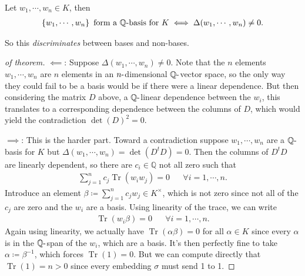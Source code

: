 \begin{theorem}

Let \(w_1, \cdots, w_n\in K\), then
\begin{align*}
\left\{{ w_1, \cdots, w_n }\right\} \text{ form a ${\mathbb{Q}}{\hbox{-}}$basis for $K$}
\iff
\Delta(w_1, \cdots, w_n) \neq 0
.\end{align*}

\end{theorem}

\begin{remark}

So this \emph{discriminates} between bases and non-bases.

\end{remark}

\begin{proof}[of theorem]

\(\impliedby\): Suppose \(\Delta(w_1, \cdots, w_n) \neq 0\). Note that
the \(n\) elements \(w_1, \cdots, w_n\) are \(n\) elements in an
\(n{\hbox{-}}\)dimensional \({\mathbb{Q}}{\hbox{-}}\)vector space, so
the only way they could fail to be a basis would be if there were a
linear dependence. But then considering the matrix \(D\) above, a
\({\mathbb{Q}}{\hbox{-}}\)linear dependence between the \(w_i\), this
translates to a corresponding dependence between the columns of \(D\),
which would yield the contradiction \(\det(D)^2 = 0\).

\hfill\break

\(\implies\): This is the harder part. Toward a contradiction suppose
\(w_1, \cdots, w_n\) are a \({\mathbb{Q}}{\hbox{-}}\)basis for \(K\) but
\(\Delta(w_1, \cdots, w_n) = \det(D^t D) = 0\). Then the columns of
\(D^t D\) are linearly dependent, so there are \(c_i \in {\mathbb{Q}}\)
not all zero such that
\begin{align*}
\sum_{j=1}^n c_j \operatorname{Tr}( w_i w_j) = 0 && \forall i=1, \cdots, n
.\end{align*}
Introduce an element
\(\beta \coloneqq\sum_{j=1}^n c_j w_j \in K^{\times}\), which is not
zero since not all of the \(c_j\) are zero and the \(w_i\) are a basis.
Using linearity of the trace, we can write
\begin{align*}
\operatorname{Tr}(w_i \beta) = 0 && \forall i=1, \cdots, n
.\end{align*}
Again using linearity, we actually have
\(\operatorname{Tr}( \alpha \beta) = 0\) for all \(\alpha\in K\) since
every \(\alpha\) is in the \({\mathbb{Q}}{\hbox{-}}\)span of the
\(w_i\), which are a basis. It's then perfectly fine to take
\(\alpha \coloneqq\beta^{-1}\), which forces
\(\operatorname{Tr}(1) = 0\). But we can compute directly that
\(\operatorname{Tr}(1) = n > 0\) since every embedding \(\sigma\) must
send 1 to 1.

\end{proof}

